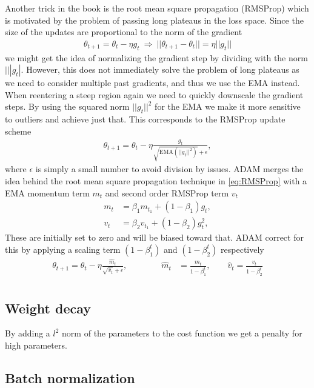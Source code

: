 Another trick in the book is the root mean square propagation (RMSProp) which is motivated by the problem of passing long plateaus in the loss space. Since the size of the updates are proportional to the norm of the gradient
\begin{align*}
  \theta_{t+1} = \theta_t - \eta g_t \ \Longrightarrow \ ||\theta_{t+1}-\theta_{t}|| = \eta ||g_t||
\end{align*}
we might get the idea of normalizing the gradient step by dividing with the norm $|||g_t|$.  However, this does not immediately solve the problem of long plateaus as we need to consider multiple past gradients, and thus we use the EMA instead. When reentering a steep region again we need to quickly downscale the gradient steps. By using the squared norm $||g_t||^2$ for the EMA we make it more sensitive to outliers and achieve just that. This corresponds to the RMSProp update scheme
\begin{align}
  \theta_{t+1} = \theta_t - \eta \frac{g_t}{\sqrt{\text{EMA}(||g_t||^2)} + \epsilon},
  \label{eq:RMSProp}
\end{align}
where $\epsilon$ is simply a small number to avoid division by issues. ADAM merges the idea behind the root mean square propagation technique in \cref{eq:RMSProp} with a EMA momentum term $m_t$ and second order RMSProp term $v_t$ 
\begin{align*}
  m_t &= \beta_1 m_{t_1} + (1-\beta_1)g_t, \\
  v_t &= \beta_2 v_{t_1} + (1-\beta_2)g_t^2, 
\end{align*}
These are initially set to zero and will be biased toward that. ADAM correct for this by applying a scaling term $(1-\beta^t_1)$ and $(1-\beta^t_2)$ respectively
\begin{align}
  \theta_{t+1} = \theta_t - \eta \frac{\hat{m}_t}{\sqrt{\hat{v}_t} + \epsilon}, \qquad \qquad \hat{m}_t &= \frac{m_t}{1-\beta^t_1}, \qquad \hat{v}_t = \frac{v_t}{1-\beta^t_2} \\
  \label{eq:ADAM}
\end{align}


\subsection{Weight decay}
By adding a $l^2$ norm of the parameters to the cost function we get a penalty for high parameters. 


\subsection{Batch normalization}

